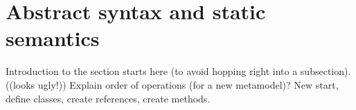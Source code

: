 \newpage
\section{Abstract syntax and static semantics}
\label{sec: staticSemantics}

Introduction to the section starts here (to avoid hopping right into a subsection). ((looks ugly!))
Explain order of operations (for a new metamodel)? New start, define classes, create references, create methods.












 
